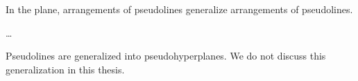 In the plane, arrangements of pseudolines generalize arrangements of
pseudolines.

\dots

Pseudolines are generalized into pseudohyperplanes. We do not discuss this
generalization in this thesis.
